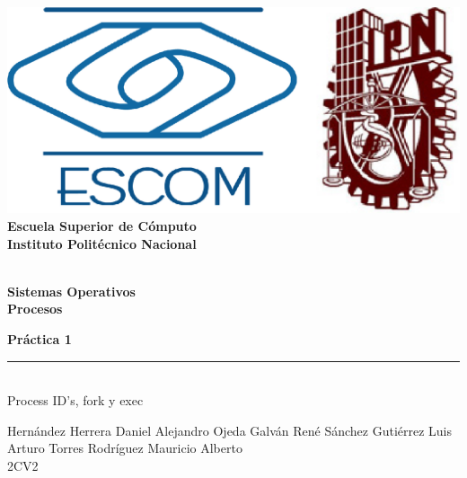 
\begin{titlepage} %

    \begin{flushright}

	   \includegraphics[scale=0.15]{imagenes/escom-ipn.png}
	   \large \textbf{\\Escuela Superior de C\'omputo}
	   \large \textbf{\\Instituto Polit\'ecnico Nacional }%

	   \vspace{2.5cm} %

	   \large \textbf{\\Sistemas Operativos}%
	   \large \textbf{\\Procesos}%

	   \vspace{1.2cm} %

	   \large \textbf{Pr\'actica 1}\\%
	   \rule{6cm}{3pt} %
	   \large{\\ Process ID's, fork y exec} %

	   \vspace{2.5cm} %

	   Hernández Herrera Daniel Alejandro
	   	   Ojeda Galván René
	   	   Sánchez Gutiérrez Luis Arturo
	   	   Torres Rodríguez Mauricio Alberto \\ %
	   2CV2 %

	   \vspace{2.5cm} %

	   \date{\today}

    \end{flushright}

\end{titlepage}
